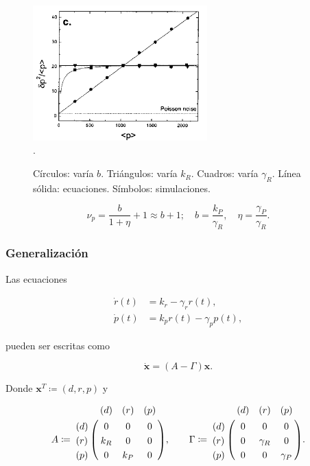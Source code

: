\documentclass{beamer}
\begin{document}
\begin{frame}
\begin{figure}[p]
    \centering
    \includegraphics[width=0.6\textwidth]{graph1.png}\\
    \tiny \cite{p1}.
    \caption{C\'irculos: var\'ia $b$. Tri\'angulos: var\'ia $k_R$. Cuadros: var\'ia $\gamma_R$. L\'inea s\'olida: ecuaciones. S\'imbolos: simulaciones.}
\end{figure}
\begin{equation*}
\nu_p = \frac{b}{1+\eta} + 1 \approx b + 1; \quad b = \frac{k_P}{\gamma_R}, \quad \eta = \frac{\gamma_P}{\gamma_R}.
\end{equation*}
\end{frame}


\begin{frame}
\frametitle{Generalizaci\'on}

Las ecuaciones

\begin{align*}
\dot{r}(t) &= k_r - \gamma_rr(t),\\
\dot{p}(t) &= k_pr(t) - \gamma_pp(t),
\end{align*}

pueden ser escritas como

\begin{equation*}
\mathbf{\dot{x}} = (A - \Gamma)\mathbf{x}.
\end{equation*}

Donde $\mathbf{x}^T \coloneqq (d, r, p)$ y

\begin{align*}
A \coloneqq \bordermatrix{
  ~ & (d) & (r) & (p) \cr
  (d) & 0 & 0 & 0 \cr
  (r) & k_R & 0 & 0 \cr
  (p) & 0 & k_P & 0 \cr}, \quad \quad
\Gamma \coloneqq \bordermatrix{
  ~ & (d) & (r) & (p) \cr
  (d) & 0 & 0 & 0 \cr
  (r) & 0 & \gamma_R & 0 \cr
  (p) & 0 & 0 & \gamma_P \cr}.\\
\end{align*}
\end{frame}
\end{document}

